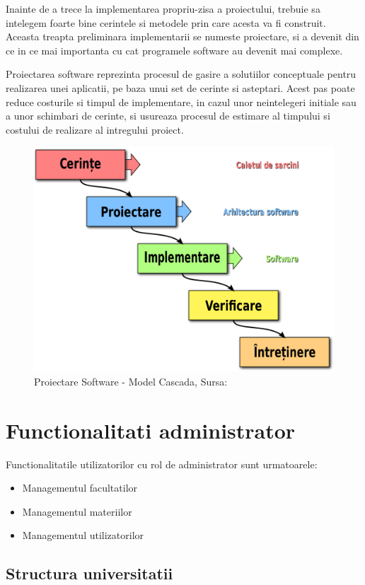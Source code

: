 \documentclass[12pt, a4paper, oneside, romanian]{teza-upb}
\begin{document}
Inainte de a trece la implementarea propriu-zisa a proiectului, trebuie sa intelegem foarte bine cerintele si metodele prin care acesta va fi construit. Aceasta treapta preliminara implementarii se numeste proiectare, si a devenit din ce in ce mai importanta cu cat programele software au devenit mai complexe.

Proiectarea software reprezinta procesul de gasire a solutiilor conceptuale pentru realizarea unei aplicatii, pe baza unui set de cerinte si asteptari. Acest pas poate reduce costurile si timpul de implementare, in cazul unor neintelegeri initiale sau a unor schimbari de cerinte, si usureaza procesul de estimare al timpului si costului de realizare al intregului proiect.

\begin{figure}[H]
\centering
\includegraphics*[width=0.55\columnwidth]{proiectare-software-model-cascada}
\caption{Proiectare Software - Model Cascada, Sursa: \cite{proiectaresoftwaremodelcascada}}
\label{proiectare-software-model-cascada}
\end{figure}

\section{Functionalitati administrator}

Functionalitatile utilizatorilor cu rol de administrator sunt urmatoarele:
\begin{itemize}
	\item Managementul facultatilor
	\item Managementul materiilor
	\item Managementul utilizatorilor
\end{itemize}

\subsection{Structura universitatii}
\end{document}
